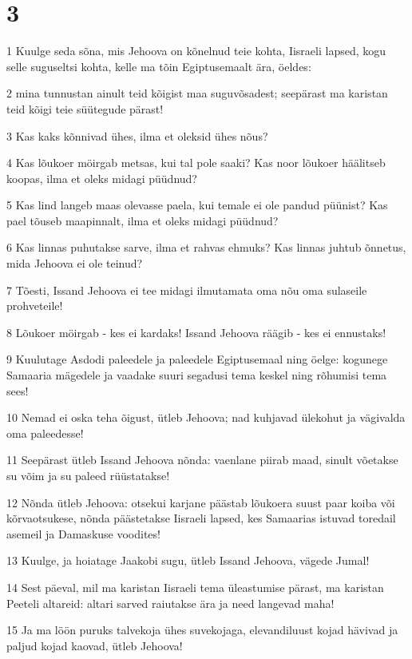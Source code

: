 \chapter{3}

\par 1 Kuulge seda sõna, mis Jehoova on kõnelnud teie kohta, Iisraeli lapsed, kogu selle suguseltsi kohta, kelle ma tõin Egiptusemaalt ära, öeldes:
\par 2 mina tunnustan ainult teid kõigist maa suguvõsadest; seepärast ma karistan teid kõigi teie süütegude pärast!
\par 3 Kas kaks kõnnivad ühes, ilma et oleksid ühes nõus?
\par 4 Kas lõukoer möirgab metsas, kui tal pole saaki? Kas noor lõukoer häälitseb koopas, ilma et oleks midagi püüdnud?
\par 5 Kas lind langeb maas olevasse paela, kui temale ei ole pandud püünist? Kas pael tõuseb maapinnalt, ilma et oleks midagi püüdnud?
\par 6 Kas linnas puhutakse sarve, ilma et rahvas ehmuks? Kas linnas juhtub õnnetus, mida Jehoova ei ole teinud?
\par 7 Tõesti, Issand Jehoova ei tee midagi ilmutamata oma nõu oma sulaseile prohveteile!
\par 8 Lõukoer möirgab - kes ei kardaks! Issand Jehoova räägib - kes ei ennustaks!
\par 9 Kuulutage Asdodi paleedele ja paleedele Egiptusemaal ning öelge: kogunege Samaaria mägedele ja vaadake suuri segadusi tema keskel ning rõhumisi tema sees!
\par 10 Nemad ei oska teha õigust, ütleb Jehoova; nad kuhjavad ülekohut ja vägivalda oma paleedesse!
\par 11 Seepärast ütleb Issand Jehoova nõnda: vaenlane piirab maad, sinult võetakse su võim ja su paleed rüüstatakse!
\par 12 Nõnda ütleb Jehoova: otsekui karjane päästab lõukoera suust paar koiba või kõrvaotsukese, nõnda päästetakse Iisraeli lapsed, kes Samaarias istuvad toredail asemeil ja Damaskuse voodites!
\par 13 Kuulge, ja hoiatage Jaakobi sugu, ütleb Issand Jehoova, vägede Jumal!
\par 14 Sest päeval, mil ma karistan Iisraeli tema üleastumise pärast, ma karistan Peeteli altareid: altari sarved raiutakse ära ja need langevad maha!
\par 15 Ja ma löön puruks talvekoja ühes suvekojaga, elevandiluust kojad hävivad ja paljud kojad kaovad, ütleb Jehoova!

